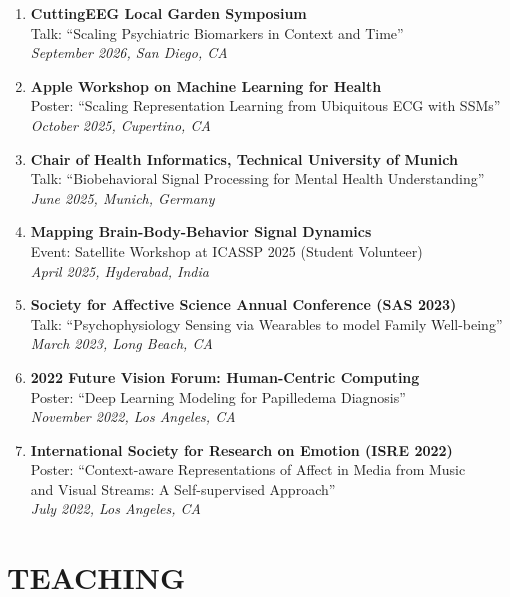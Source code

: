\documentclass[margin]{res}
\begin{document}
\begin{resume}
\begin{enumerate}[leftmargin=*,itemsep=2pt]
    \item \textbf{CuttingEEG Local Garden Symposium} \\ Talk: ``Scaling Psychiatric Biomarkers in Context and Time'' \\ \textit{September 2026, San Diego, CA}
    \item \textbf{Apple Workshop on Machine Learning for Health} \\ Poster: ``Scaling Representation Learning from Ubiquitous ECG with SSMs'' \\ \textit{October 2025, Cupertino, CA}
    \item \textbf{Chair of Health Informatics, Technical University of Munich} \\ Talk: ``Biobehavioral Signal Processing for Mental Health Understanding'' \\ \textit{June 2025, Munich, Germany}
    \item \textbf{Mapping Brain-Body-Behavior Signal Dynamics} \\ Event: Satellite Workshop at ICASSP 2025 (Student Volunteer) \\ \textit{April 2025, Hyderabad, India}
    \item \textbf{Society for Affective Science Annual Conference (SAS 2023)} \\ Talk: ``Psychophysiology Sensing via Wearables to model Family Well-being'' \\ \textit{March 2023, Long Beach, CA}
    \item \textbf{2022 Future Vision Forum: Human-Centric Computing} \\
    Poster: ``Deep Learning Modeling for Papilledema Diagnosis'' \\ \textit{November 2022, Los Angeles, CA}
    \item \textbf{International Society for Research on Emotion (ISRE 2022)}\\ Poster: ``Context-aware Representations of Affect in Media from Music \\ and Visual Streams: A Self-supervised Approach'' \\ \textit{July 2022, Los Angeles, CA}
\end{enumerate}

\section{TEACHING}
\begin{minipage}[t]{\linewidth}


\end{minipage}
\end{resume}
\end{document}
